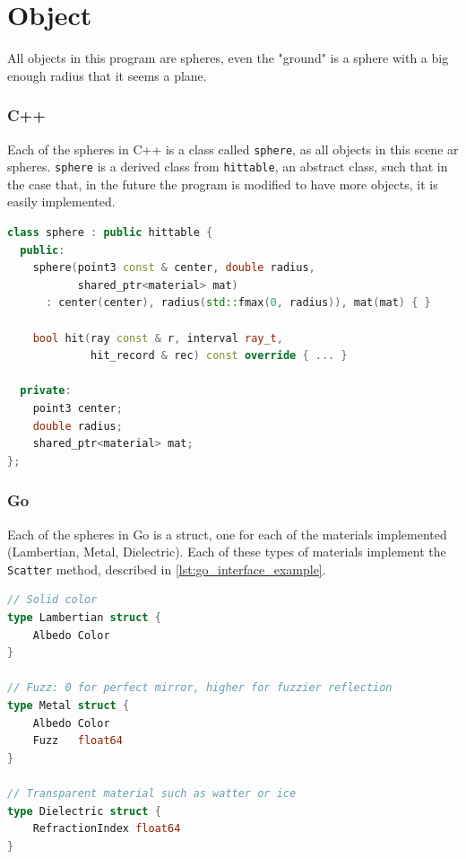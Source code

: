 

\section{Object}
All objects in this program are spheres, even the "ground" is a sphere with a big enough radius that it seems a plane.

\subsubsection{C++}
Each of the spheres in C++ is a class called \texttt{sphere}, as all objects in this scene ar spheres. \texttt{sphere} is a derived class from \texttt{hittable}, an abstract class, such that in the case that, in the future the program is modified to have more objects, it is easily implemented. 

\begin{lstlisting}[language=C++, caption={Sphere Class for C++}, label={lst:sphere_cpp}]
class sphere : public hittable {
  public:
    sphere(point3 const & center, double radius,
           shared_ptr<material> mat)
      : center(center), radius(std::fmax(0, radius)), mat(mat) { }

    bool hit(ray const & r, interval ray_t,
             hit_record & rec) const override { ... }

  private:
    point3 center;
    double radius;
    shared_ptr<material> mat;
};
\end{lstlisting}



\subsubsection{Go}
Each of the spheres in Go is a struct, one for each of the materials implemented (Lambertian, Metal, Dielectric). Each of these types of materials implement the \texttt{Scatter} method, described in \autoref{lst:go_interface_example}.

\begin{lstlisting}[language=Go, caption={Go materials structs.}, label={lst:go_materials_structs}]
// Solid color
type Lambertian struct {
	Albedo Color
}

// Fuzz: 0 for perfect mirror, higher for fuzzier reflection
type Metal struct {
	Albedo Color
	Fuzz   float64 
}

// Transparent material such as watter or ice
type Dielectric struct {
	RefractionIndex float64
}
\end{lstlisting}




